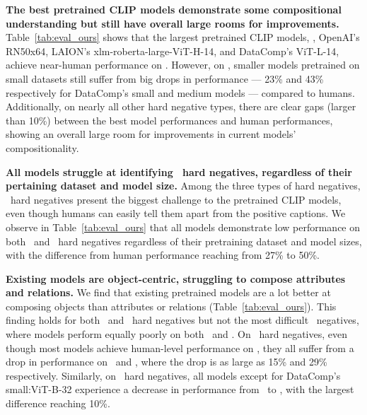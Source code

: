\textbf{The best pretrained CLIP models demonstrate some compositional understanding but still have overall large rooms for improvements.} Table~\ref{tab:eval_ours} shows that the largest pretrained CLIP models, \eg, OpenAI's RN50x64, LAION's xlm-roberta-large-ViT-H-14, and DataComp's ViT-L-14, achieve near-human performance on \replaceobj. However, on \replaceobj, smaller models pretrained on small datasets still suffer from big drops in performance --- 23\% and 43\% respectively for DataComp's small and medium models --- compared to humans. Additionally, on nearly all other hard negative types, there are clear gaps (larger than 10\%) between the best model performances and human performances, showing an overall large room for improvements in current models' compositionality.

\textbf{All models struggle at identifying \swap\ hard negatives, regardless of their pertaining dataset and model size.} Among the three types of hard negatives, \swap\ hard negatives present the biggest challenge to the pretrained CLIP models, even though humans can easily tell them apart from the positive captions.  We observe in Table~\ref{tab:eval_ours} that all models demonstrate low performance on both \swapobj\ and \swapatt\ hard negatives regardless of their pretraining dataset and model sizes, with the difference from human performance reaching from 27\% to 50\%.

\textbf{Existing models are object-centric, struggling to compose attributes and relations.} We find that existing pretrained models are a lot better at composing objects than attributes or relations (Table~\ref{tab:eval_ours}). This finding holds for both \replace\ and \add\ hard negatives but not the most difficult \swap\ negatives, where models perform equally poorly on both \swapobj\ and \swapatt.
On \replace\ hard negatives, even though most models achieve human-level performance on \replaceobj, they all suffer from a drop in performance on \replaceatt\ and \replacerel, where the drop is as large as 15\% and 29\% respectively.
Similarly, on \add\ hard negatives, all models except for DataComp's small:ViT-B-32 experience a decrease in performance from \addobj\ to \addatt, with the largest difference reaching 10\%. 

